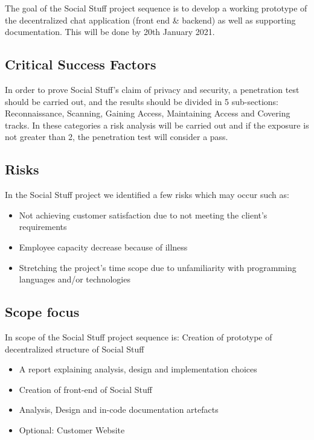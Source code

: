 The goal of the Social Stuff project sequence is to develop a working prototype of the decentralized chat application
(front end \& backend) as well as supporting documentation.
This will be done by 20th January 2021.

\subsection{Critical Success Factors}\label{subsec:critical-success-factors}

In order to prove Social Stuff’s claim of privacy and security, a penetration test should be carried out, and the
results should be divided in 5 sub-sections: Reconnaissance, Scanning, Gaining Access, Maintaining Access and Covering
tracks.
In these categories a risk analysis will be carried out and if the exposure is not greater than 2, the penetration test
will consider a pass.

\subsection{Risks}\label{subsec:risks}

In the Social Stuff project we identified a few risks which may occur such as:

\begin{itemize}
    \item Not achieving customer satisfaction due to not meeting the client’s requirements
    \item Employee capacity decrease because of illness
    \item Stretching the project’s time scope due to unfamiliarity with programming languages and/or technologies
\end{itemize}

\subsection{Scope focus}

In scope of the Social Stuff project sequence is: Creation of prototype of decentralized structure of Social Stuff

\begin{itemize}
    \item A report explaining analysis, design and implementation choices
    \item Creation of front-end of Social Stuff
    \item Analysis, Design and in-code documentation artefacts
    \item Optional: Customer Website
\end{itemize}

